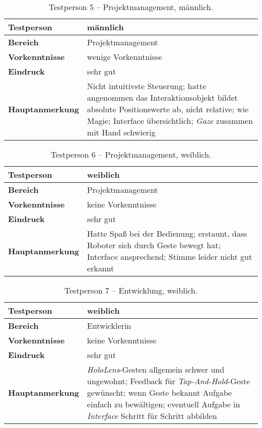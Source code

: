 \begin{table}[H]
	\centering
	\begin{tabular}{|l|p{8cm}|}
		\hline
		\textbf{Testperson} & männlich  \\
		\hline
		\textbf{Bereich} & Projektmanagement \\
		\hline
		\textbf{Vorkenntnisse} & wenige Vorkenntnisse \\
		\hline
		\textbf{Eindruck} & sehr gut \\
		\hline
		\textbf{Hauptanmerkung} & Nicht intuitivste Steuerung; hatte angenommen das Interaktionsobjekt bildet absolute Positionswerte ab, nicht relative; wie Magie; Interface übersichtlich; \textit{Gaze} zusammen mit Hand schwierig\\
		\hline
	\end{tabular}
	\caption{Testperson 5 -- Projektmanagement, männlich.}
	\label{tab:scoreProjectmanagment1}
\end{table}
\begin{table}[H]
	\centering
	\begin{tabular}{|l|p{8cm}|}
		\hline
		\textbf{Testperson} & weiblich  \\
		\hline
		\textbf{Bereich} & Projektmanagement \\
		\hline
		\textbf{Vorkenntnisse} & keine Vorkenntnisse \\
		\hline
		\textbf{Eindruck} & sehr gut \\
		\hline
		\textbf{Hauptanmerkung} & Hatte Spaß bei der Bedienung; erstaunt, dass Roboter sich durch Geste bewegt hat; Interface ansprechend; Stimme leider nicht gut erkannt\\
		\hline
	\end{tabular}
	\caption{Testperson 6 -- Projektmanagement, weiblich.}
	\label{tab:scoreProjectmanagment2}
\end{table}

\begin{table}[H]
	\centering
	\begin{tabular}{|l|p{8cm}|}
		\hline
		\textbf{Testperson} & weiblich  \\
		\hline
		\textbf{Bereich} & Entwicklerin \\
		\hline
		\textbf{Vorkenntnisse} & keine Vorkenntnisse \\
		\hline
		\textbf{Eindruck} & sehr gut \\
		\hline
		\textbf{Hauptanmerkung} & \textit{HoloLens}-Gesten allgemein schwer und ungewohnt; Feedback für \textit{Tap-And-Hold}-Geste gewünscht; wenn Geste bekannt Aufgabe einfach zu bewältigen; eventuell Aufgabe in \textit{Interface} Schritt für Schritt abbilden\\
		\hline
	\end{tabular}
	\caption{Testperson 7 -- Entwicklung, weiblich.}
	\label{tab:scoreDevelopment1}
\end{table}

